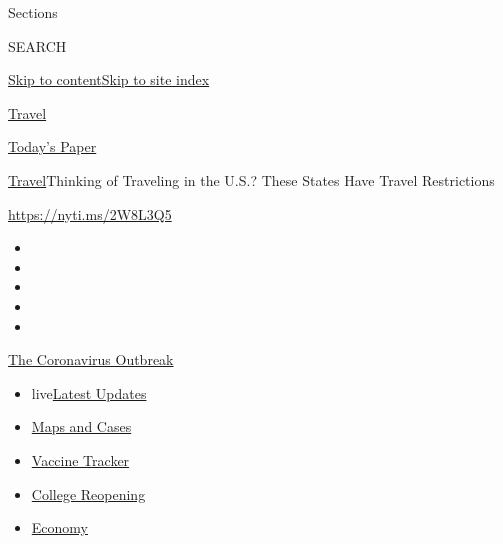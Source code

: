 Sections

SEARCH

\protect\hyperlink{site-content}{Skip to
content}\protect\hyperlink{site-index}{Skip to site index}

\href{https://www.nytimes3xbfgragh.onion/section/travel}{Travel}

\href{https://myaccount.nytimes3xbfgragh.onion/auth/login?response_type=cookie\&client_id=vi}{}

\href{https://www.nytimes3xbfgragh.onion/section/todayspaper}{Today's
Paper}

\href{/section/travel}{Travel}\textbar{}Thinking of Traveling in the
U.S.? These States Have Travel Restrictions

\url{https://nyti.ms/2W8L3Q5}

\begin{itemize}
\item
\item
\item
\item
\item
\end{itemize}

\href{https://www.nytimes3xbfgragh.onion/news-event/coronavirus?action=click\&pgtype=Article\&state=default\&region=TOP_BANNER\&context=storylines_menu}{The
Coronavirus Outbreak}

\begin{itemize}
\tightlist
\item
  live\href{https://www.nytimes3xbfgragh.onion/2020/08/04/world/coronavirus-cases.html?action=click\&pgtype=Article\&state=default\&region=TOP_BANNER\&context=storylines_menu}{Latest
  Updates}
\item
  \href{https://www.nytimes3xbfgragh.onion/interactive/2020/us/coronavirus-us-cases.html?action=click\&pgtype=Article\&state=default\&region=TOP_BANNER\&context=storylines_menu}{Maps
  and Cases}
\item
  \href{https://www.nytimes3xbfgragh.onion/interactive/2020/science/coronavirus-vaccine-tracker.html?action=click\&pgtype=Article\&state=default\&region=TOP_BANNER\&context=storylines_menu}{Vaccine
  Tracker}
\item
  \href{https://www.nytimes3xbfgragh.onion/2020/08/02/us/covid-college-reopening.html?action=click\&pgtype=Article\&state=default\&region=TOP_BANNER\&context=storylines_menu}{College
  Reopening}
\item
  \href{https://www.nytimes3xbfgragh.onion/live/2020/08/04/business/stock-market-today-coronavirus?action=click\&pgtype=Article\&state=default\&region=TOP_BANNER\&context=storylines_menu}{Economy}
\end{itemize}

